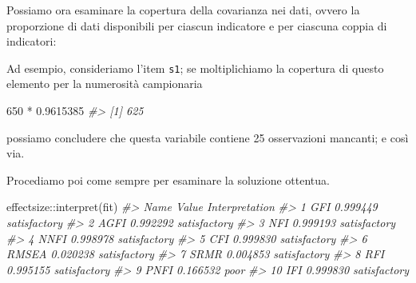 \documentclass[
  11pt,
]{krantz}
\makeatletter
\newenvironment{Shaded}{\begin{snugshade}}{\end{snugshade}}
\newcommand{\CommentTok}[1]{\textcolor[rgb]{0.37,0.37,0.37}{\textit{#1}}}
\newcommand{\DecValTok}[1]{\textcolor[rgb]{0.06,0.06,0.06}{#1}}
\newcommand{\FloatTok}[1]{\textcolor[rgb]{0.06,0.06,0.06}{#1}}
\newcommand{\FunctionTok}[1]{\textcolor[rgb]{0,0,0}{#1}}
\newcommand{\NormalTok}[1]{#1}
\newcommand{\OtherTok}[1]{\textcolor[rgb]{0.37,0.37,0.37}{#1}}
\newcommand{\SpecialCharTok}[1]{\textcolor[rgb]{0,0,0}{#1}}
\newenvironment{kframe}{%
\medskip{}
\setlength{\fboxsep}{.8em}
 \def\at@end@of@kframe{}%
 \ifinner\ifhmode%
  \def\at@end@of@kframe{\end{minipage}}%
  \begin{minipage}{\columnwidth}%
 \fi\fi%
 \def\FrameCommand##1{\hskip\@totalleftmargin \hskip-\fboxsep
 \colorbox{shadecolor}{##1}\hskip-\fboxsep
     \hskip-\linewidth \hskip-\@totalleftmargin \hskip\columnwidth}%
 \MakeFramed {\advance\hsize-\width
   \@totalleftmargin\z@ \linewidth\hsize
   \@setminipage}}%
 {\par\unskip\endMakeFramed%
 \at@end@of@kframe}
\renewenvironment{Shaded}{\begin{kframe}}{\end{kframe}}
\theoremstyle{definition}
\theoremstyle{definition}
\theoremstyle{definition}
\theoremstyle{definition}
\theoremstyle{remark}
\makeatother
\begin{document}
Possiamo ora esaminare la copertura della covarianza nei dati, ovvero la proporzione di dati disponibili per ciascun indicatore e per ciascuna coppia di indicatori:

\begin{Shaded}
\end{Shaded}

Ad esempio, consideriamo l'item \texttt{s1}; se moltiplichiamo la copertura di questo elemento per la numerosità campionaria

\begin{Shaded}
\begin{Highlighting}[]
\DecValTok{650} \SpecialCharTok{*} \FloatTok{0.9615385}
\CommentTok{\#\textgreater{} [1] 625}
\end{Highlighting}
\end{Shaded}

possiamo concludere che questa variabile contiene 25 osservazioni mancanti; e così via.

Procediamo poi come sempre per esaminare la soluzione ottentua.

\begin{Shaded}
\begin{Highlighting}[]
\NormalTok{effectsize}\SpecialCharTok{::}\FunctionTok{interpret}\NormalTok{(fit)}
\CommentTok{\#\textgreater{}     Name    Value Interpretation}
\CommentTok{\#\textgreater{} 1    GFI 0.999449   satisfactory}
\CommentTok{\#\textgreater{} 2   AGFI 0.992292   satisfactory}
\CommentTok{\#\textgreater{} 3    NFI 0.999193   satisfactory}
\CommentTok{\#\textgreater{} 4   NNFI 0.998978   satisfactory}
\CommentTok{\#\textgreater{} 5    CFI 0.999830   satisfactory}
\CommentTok{\#\textgreater{} 6  RMSEA 0.020238   satisfactory}
\CommentTok{\#\textgreater{} 7   SRMR 0.004853   satisfactory}
\CommentTok{\#\textgreater{} 8    RFI 0.995155   satisfactory}
\CommentTok{\#\textgreater{} 9   PNFI 0.166532           poor}
\CommentTok{\#\textgreater{} 10   IFI 0.999830   satisfactory}
\end{Highlighting}
\end{Shaded}
\end{document}
